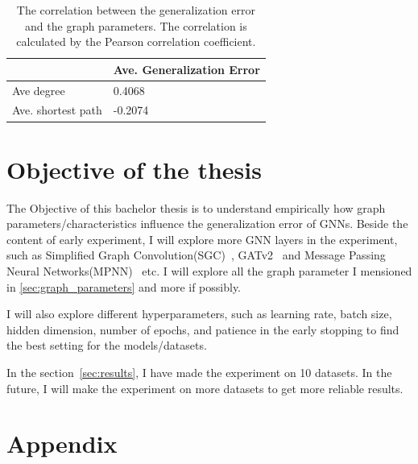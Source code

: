\documentclass{article}
\begin{document}
\begin{table}[h]
    \centering
    \begin{tabular}{@{}ll@{}}
    \toprule
                       & Ave. Generalization Error \\ \midrule
    Ave degree            & 0.4068                    \\
    Ave. shortest path & -0.2074                   \\ \bottomrule
    \end{tabular}
    \caption{The correlation between the generalization error and the graph parameters. The correlation is calculated by the Pearson correlation coefficient.}
    \label{tab:correlation}
    \end{table}

\newpage

\section{Objective of the thesis}

The Objective of this bachelor thesis is to understand empirically how graph parameters/characteristics influence the generalization error of GNNs. Beside the content of early experiment, I will explore more GNN layers in the experiment, such as Simplified Graph Convolution(SGC)~\cite{wu2019simplifying}, GATv2~\cite{brody2021attentive} and Message Passing Neural Networks(MPNN)~\cite{gilmer2017neural} etc.
I will explore all the graph parameter I mensioned in \ref{sec:graph_parameters} and more if possibly. 

I will also explore different hyperparameters, such as learning rate, batch size, hidden dimension, number of epochs, and patience in the early stopping to find the best setting for the models/datasets. 


In the section~\ref{sec:results}, I have made the experiment on 10 datasets. In the future, I will make the experiment on more datasets to get more reliable results.

\clearpage

\tableofcontents

\newpage



\newpage 

\section{Appendix} 
 
\end{document}
